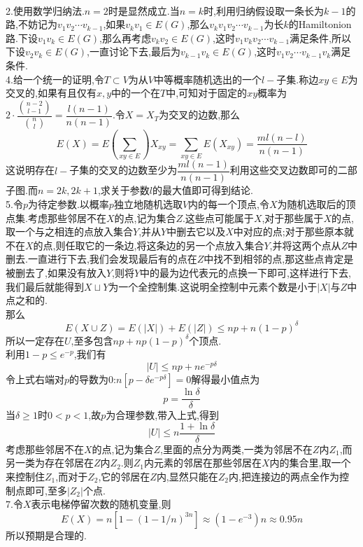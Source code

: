 \documentclass[b5paper]{ctexart}
\begin{document}
\pagestyle{plain}
\noindent
{}
\\
2.使用数学归纳法.$n=2$时是显然成立.当$n=k$时,利用归纳假设取一条长为$k-1$的路,不妨记为$v_1v_2\cdots v_{k-1}$,如果$v_kv_1\in E(G)$,那么$v_kv_1v_2\cdots v_{k-1}$为长$k$的Hamiltonion路.下设$v_1v_k\in E(G)$,那么再考虑$v_kv_2\in E(G)$,这时$v_1v_kv_2\cdots v_{k-1}$满足条件,所以下设$v_2v_k\in E(G)$,一直讨论下去,最后为$v_{k-1}v_k\in E(G)$,这时$v_1v_2\cdots v_{k-1}v_k$满足条件.\\
4.给一个统一的证明,令$T\subset V$为从$V$中等概率随机选出的一个$l-$子集.称边$xy\in E$为交叉的,如果有且仅有$x,y$中的一个在$T$中,可知对于固定的$xy$概率为$2\cdot \dfrac{\binom{n-2}{l-1}}{\binom{n}{l}}=\dfrac{l(n-1)}{n(n-1)}$.令$X=X_{T}$为交叉的边数,那么
\[E(X)=E(\sum_{xy\in E})X_{xy}=\sum_{xy\in E}E(X_{xy})=\dfrac{ml(n-l)}{n(n-1)}\]
这说明存在$l-$子集的交叉的边数至少为$\dfrac{ml(n-1)}{n(n-1)}$利用这些交叉边数即可的二部子图.而$n=2k,2k+1$,求关于参数$l$的最大值即可得到结论.\\
5.令$p$为待定参数.以概率$p$独立地随机选取$V$内的每一个顶点,令$X$为随机选取后的顶点集.考虑那些邻居不在$X$的点,记为集合$Z$.这些点可能属于$X$,对于那些属于$X$的点,取一个与之相连的点放入集合$Y$,并从$Y$中删去它以及$X$中对应的点;对于那些原本就不在$X$的点,则任取它的一条边,将这条边的另一个点放入集合$Y$,并将这两个点从$Z$中删去.一直进行下去,我们会发现最后有的点在$Z$中找不到相邻的点,那这些点肯定是被删去了,如果没有放入$Y$,则将$Y$中的最为边代表元的点换一下即可,这样进行下去,我们最后就能得到$X\sqcup Y$为一个全控制集.这说明全控制中元素个数是小于$|X|$与$Z$中点之和的.\\
那么\[E(X\cup Z)=E(|X|)+E(|Z|)\leq np+n(1-p)^{\delta}\]
所以一定存在$U$,至多包含$np+np(1-p)^{\delta}$个顶点.\\
利用$1-p\leq e^{-p}$,我们有
\[|U|\leq np+ne^{-p\delta}\]
令上式右端对$p$的导数为0:$n[p-\delta e^{-p\delta}]=0$解得最小值点为
\[p=\dfrac{\ln\delta}{\delta}\]
当$\delta\geq 1$时$0<p<1$,故$p$为合理参数,带入上式,得到\\
\[|U|\leq n\dfrac{1+\ln\delta}{\delta}\]
考虑那些邻居不在$X$的点,记为集合$Z$,里面的点分为两类,一类为邻居不在$Z$内$Z_1$,而另一类为存在邻居在$Z$内$Z_2$.则$Z_1$内元素的邻居在那些邻居在$X$内的集合里,取一个来控制住$Z_1$,而对于$Z_2$,它的邻居在$Z$内,显然只能在$Z_2$内,把连接边的两点全作为控制点即可,至多$|Z_2|$个点.\\
7.令$X$表示电梯停留次数的随机变量,则
\[E(X)=n[1-(1-1/n)^{3n}]\approx (1-e^{-3})n\approx 0.95n\]
所以预期是合理的.
\end{document}
